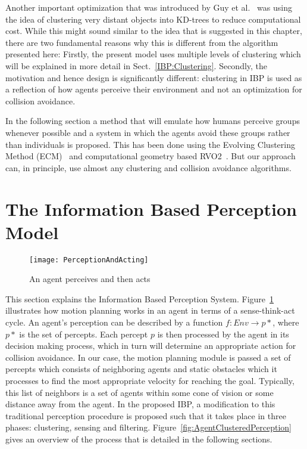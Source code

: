 Another important optimization that was introduced by Guy et al.~\cite{Guy:2010uv} was using the idea of clustering very distant objects into KD-trees to reduce computational cost. While this might sound similar to the idea that is suggested in this chapter, there are two fundamental reasons why this is different from the algorithm presented here: Firstly, the present model uses multiple levels of clustering which will be explained in more detail in Sect.~\ref{IBP:Clustering}. Secondly, the motivation and hence design is significantly different: clustering in IBP is used as a reflection of how agents perceive their environment and not an optimization for collision avoidance. 

In the following section a method that will emulate how humans perceive groups whenever possible and a system in which the agents avoid these groups rather than individuals is proposed. This has been done using the Evolving Clustering Method (ECM)~\cite{Song:2001vg} and computational geometry based RVO2~\cite{Wilkie:2009da}. But our approach can, in principle, use almost any clustering and collision avoidance algorithms.


\section{The Information Based Perception Model}
\label{IBP:Theory}

\begin{figure}[!t]
\centering
\texttt{[image: PerceptionAndActing]}
\caption[Perception and Acting]{An agent perceives and then acts}
\label{fig:AgentPerceptionAct}
\end{figure}

This section explains the Information Based Perception System. Figure~\ref{fig:AgentPerceptionAct} illustrates how motion planning works in an agent in terms of a sense-think-act cycle. An agent's perception can be described by a function $ f: Env \rightarrow p*$, where $p*$ is the set of percepts. Each percept $p$ is then processed by the agent in its decision making process, which in turn will determine an appropriate action for collision avoidance. In our case, the motion planning module is passed a set of percepts which consists of neighboring agents and static obstacles which it processes to find the most appropriate velocity for reaching the goal. Typically, this list of neighbors is a set of agents within some cone of vision or some distance away from the agent. In the proposed IBP, a modification to this traditional perception procedure is proposed such that it takes place in three phases: clustering, sensing and filtering. Figure~\ref{fig:AgentClusteredPerception} gives an overview of the process that is detailed in the following sections.


